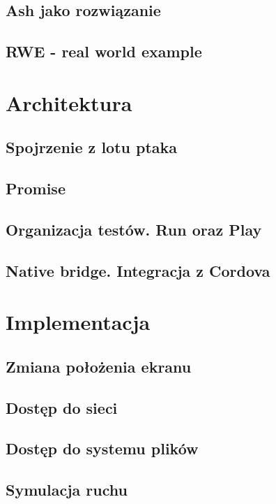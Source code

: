 \documentclass[a4paper]{article}
\begin{document}
\subsection{Ash jako rozwiązanie}

\subsection{RWE - real world example}

\section{Architektura}

\subsection{Spojrzenie z lotu ptaka}

\subsection{Promise}

\subsection{Organizacja testów. Run oraz Play}

\subsection{Native bridge. Integracja z Cordova}

\section{Implementacja}

\subsection{Zmiana położenia ekranu}

\subsection{Dostęp do sieci}

\subsection{Dostęp do systemu plików}

\subsection{Symulacja ruchu}
\end{document}
